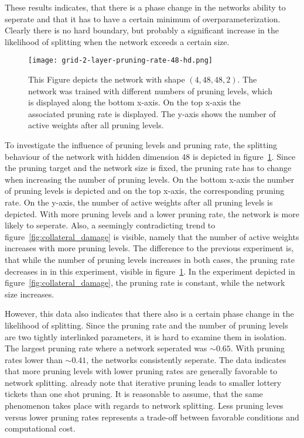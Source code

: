 These results indicates, that there is a phase change in the networks ability to seperate and that it has to have a certain minimum of overparameterization.
Clearly there is no hard boundary, but probably a significant increase in the likelihood of splitting when the network exceeds a certain size.

\begin{figure}[ht]
    \centering
    \texttt{[image: grid-2-layer-pruning-rate-48-hd.png]}
    \caption{This Figure depicts the network with shape $(4,48,48,2)$.
    The network was trained with different numbers of pruning levels, which is displayed along the bottom x-axis.
    On the top x-axis the associated pruning rate is displayed.
    The y-axis shows the number of active weights after all pruning levels.
    }\label{fig:grid-2}
\end{figure}

To investigate the influence of pruning levels and pruning rate, the splitting behaviour of the network with hidden dimension 48 is depicted in figure~\ref{fig:grid-2}.
Since the pruning target and the network size is fixed, the pruning rate has to change when increasing the number of pruning levels.
On the bottom x-axis the number of pruning levels is depicted and on the top x-axis, the corresponding pruning rate.
On the y-axis, the number of active weights after all pruning levels is depicted.
With more pruning levels and a lower pruning rate, the network is more likely to seperate.
Also, a seemingly contradicting trend to figure~\ref{fig:collateral_damage} is visible, namely that the number of active weights increases with more pruning levels.
The difference to the previous experiment is, that while the number of pruning levels increases in both cases, the pruning rate decreases in in this experiment, visible in figure~\ref{fig:grid-2}. In the experiment depicted in figure~\ref{fig:collateral_damage}, the pruning rate is constant, while the network size increases.

However, this data also indicates that there also is a certain phase change in the likelihood of splitting.
Since the pruning rate and the number of pruning levels are two tightly interlinked parameters, it is hard to examine them in isolation.
The largest pruning rate where a network seperated was $\sim0.65$. 
With pruning rates lower than $\sim0.41$, the networks consistently seperate.
The data indicates that more pruning levels with lower pruning rates are generally favorable to network splitting.
\textcite{DBLP:conf/iclr/FrankleC19} already note that iterative pruning leads to smaller lottery tickets than one shot pruning.
It is reasonable to assume, that the same phenomenon takes place with regards to network splitting.
Less pruning leves versus lower pruning rates represents a trade-off between favorable conditions and computational cost.

